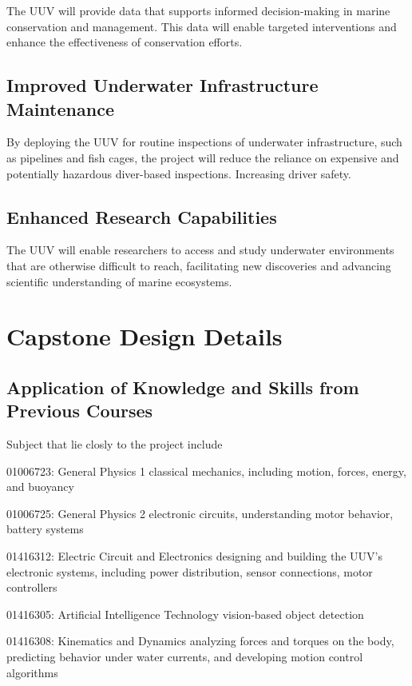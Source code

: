 The UUV will provide data that supports informed decision-making in 
marine conservation and management. This data will enable targeted 
interventions and enhance the effectiveness of conservation efforts.

\subsection{Improved Underwater Infrastructure Maintenance}

By deploying the UUV for routine inspections of underwater 
infrastructure, such as pipelines and fish cages, the project will 
reduce the reliance on expensive and potentially hazardous diver-based 
inspections. Increasing driver safety. 

\subsection{Enhanced Research Capabilities}

The UUV will enable researchers to access and study underwater 
environments that are otherwise difficult to reach, facilitating 
new discoveries and advancing scientific understanding of marine 
ecosystems.

\section{Capstone Design Details}

\subsection{Application of Knowledge and Skills from Previous Courses}

Subject that lie closly to the project include

01006723: General Physics 1 classical mechanics, including motion, forces, energy, and buoyancy 

01006725: General Physics 2 electronic circuits, understanding motor behavior, battery systems 

01416312: Electric Circuit and Electronics designing and building the UUV’s electronic systems, including power distribution, sensor connections, motor controllers 

01416305: Artificial Intelligence Technology vision-based object detection 

01416308: Kinematics and Dynamics analyzing forces and torques on the body, predicting behavior under water currents, and developing motion control algorithms 

